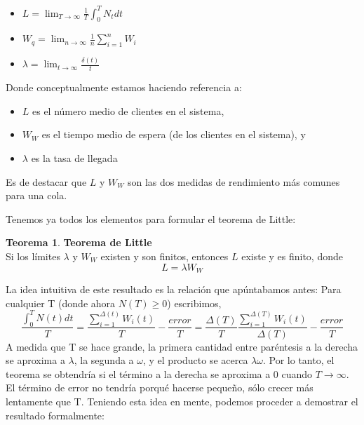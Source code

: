 \documentclass[a4paper,10pt]{scrartcl}
\theoremstyle{definition}
\newtheorem*{theorem*}{Teorema}
\numberwithin{equation}{section}
\begin{document}
\begin{itemize}
 \item $L = \lim_{T\to \infty}\frac{1}{T} \int_{0}^{T} N_t dt$
 \item $W_q = \lim_{n\to \infty}\frac{1}{n} \sum_{i=1}^{n} W_i$
 \item $\lambda = \lim_{t\to \infty}\frac{\delta(t)}{t}$
\end{itemize}

Donde conceptualmente estamos haciendo referencia a:
\begin{itemize}
 \item $L$ es el número medio de clientes en el sistema,
 \item $W_W$ es el tiempo medio de espera (de los clientes en el sistema), y
 \item $\lambda$ es la tasa de llegada 
\end{itemize}
Es de destacar que  $L$ y $W_W$ son las dos medidas de rendimiento más comunes para una cola.


Tenemos ya todos los elementos para formular el teorema de Little:
\begin{theorem*}{\textbf{Teorema de Little}}\\
Si los límites $\lambda$ y $W_W$ existen y son finitos, entonces $L$ existe y es finito, donde 
\[L = \lambda W_W\]
\end{theorem*}

La idea intuitiva de este resultado es la relación que apúntabamos antes: Para cualquier T (donde ahora $N (T) \geq 0$) escribimos,
\[ \frac{\int_{0}^{T} N(t)dt}{T}=\frac{\sum_{i=1}^{\Delta (t)} W_i(t)}{T}-\frac{error}{T}=\frac{\Delta(T)}{T}\frac{\sum_{i=1}^{\Delta (T)} W_i(t)}{\Delta(T)}-\frac{error}{T}   \]
A medida que T se hace grande, la primera cantidad entre paréntesis a la derecha se aproxima a $\lambda$, la segunda a $\omega$, y el producto se acerca $\lambda\omega$. Por lo tanto, el teorema se obtendría si el término a la derecha se aproxima a 0 cuando $T\rightarrow\infty$. El término de error no tendría porqué hacerse pequeño, sólo crecer más lentamente que T.
Teniendo esta idea en mente, podemos proceder a demostrar el resultado formalmente:
\end{document}
